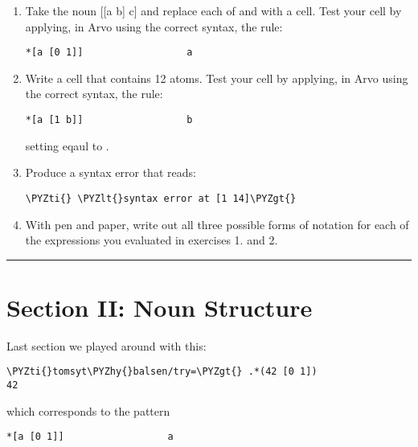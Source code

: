 \begin{enumerate}
\item Take the noun [[a b] c] and replace each of   and  with a cell. Test your cell by applying, in Arvo using the correct syntax, the rule:
\begin{framed_shaded}
\begin{Verbatim}[fontsize=\relsize{-2.5},fontseries=b,commandchars=\\\{\}]
*[a [0 1]]                  a
\end{Verbatim}
\end{framed_shaded}
\item Write a cell that contains 12 atoms. Test your cell by applying, in Arvo using the correct syntax, the rule:
\begin{framed_shaded}
\begin{Verbatim}[fontsize=\relsize{-2.5},fontseries=b,commandchars=\\\{\}]
*[a [1 b]]                  b
\end{Verbatim}
\end{framed_shaded}
setting  eqaul to .
\item Produce a syntax error that reads:
\begin{framed_shaded}
\begin{Verbatim}[fontsize=\relsize{-2.5},fontseries=b,commandchars=\\\{\}]
\PYZti{} \PYZlt{}syntax error at [1 14]\PYZgt{}
\end{Verbatim}
\end{framed_shaded}
\item With pen and paper, write out all three possible forms of notation for each
of the expressions you evaluated in exercises 1. and 2.
\end{enumerate}

\begin{center}
\rule{3in}{0.4pt}
\end{center}

\section{Section II: Noun Structure}

Last section we played around with this:

\begin{framed_shaded}
\begin{Verbatim}[fontsize=\relsize{-2.5},fontseries=b,commandchars=\\\{\}]
\PYZti{}tomsyt\PYZhy{}balsen/try=\PYZgt{} .*(42 [0 1])
42
\end{Verbatim}
\end{framed_shaded}
which corresponds to the pattern
\begin{framed_shaded}
\begin{Verbatim}[fontsize=\relsize{-2.5},fontseries=b,commandchars=\\\{\}]
*[a [0 1]]                  a
\end{Verbatim}
\end{framed_shaded}

